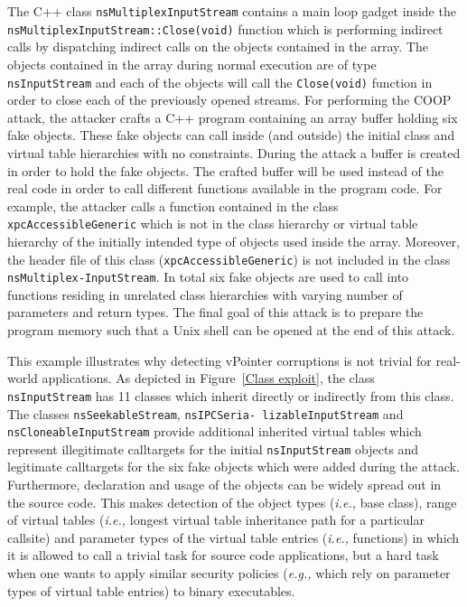The C++ class \texttt{nsMultiplexInputStream} contains a main loop gadget inside the \texttt{nsMultiplexInputStream::Close(void)} function which is performing indirect calls by dispatching indirect calls on the objects contained in the array. The objects contained in the array during normal execution are of type \texttt{nsInputStream} and each of the objects will call the \texttt{Close(void)} function in order to close each of the previously opened streams. For performing the COOP attack, the attacker crafts a C++ program containing an array buffer holding six fake objects. These fake objects can call inside (and outside) the initial class and virtual table hierarchies with no constraints. During the attack a buffer is created in order to hold the fake objects.
The crafted buffer will be used instead of the real code in order to call different functions available in the program code. For example, the attacker calls a function contained in the class \texttt{xpcAccessibleGeneric} which is not in the class hierarchy or virtual table hierarchy of the initially intended type of objects used inside the array. Moreover, the header file of this class (\texttt{xpcAccessibleGeneric}) is not included in the class \texttt{nsMultiplex-InputStream}. In total six fake objects are used to call into functions residing in unrelated class hierarchies with varying number of parameters and return types. The final goal of this attack is to prepare the program memory such that a Unix shell can be opened at the end of this attack.

This example illustrates why detecting vPointer corruptions is not trivial for real-world applications. As depicted in Figure~\ref{Class exploit}, the class \texttt{nsInputStream} has 11 classes which inherit directly or indirectly from this class. The classes \texttt{nsSeekableStream}, \texttt{nsIPCSeria- lizableInputStream} and \texttt{nsCloneableInputStream} provide additional inherited virtual tables which represent illegitimate calltargets for the initial \texttt{nsInputStream} objects and legitimate calltargets for the six fake objects which were added during the attack. Furthermore, declaration and usage of the objects can be widely spread out in the source code. This makes detection of the object types (\textit{i.e.,} base class), range of virtual tables (\textit{i.e.,} longest virtual table inheritance path for a particular callsite) and parameter types of the virtual table entries (\textit{i.e.,} functions) in which it is allowed to call a trivial task for source code applications, but a hard task when one wants to apply similar security policies 
(\textit{e.g.,} which rely on parameter types of virtual table entries) to binary executables.

